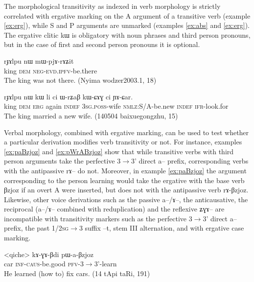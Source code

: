 \documentclass[oldfontcommands,oneside,a4paper,11pt]{article}
\newcommand{\ipa}[1]{{\phon \mbox{#1}}} %
\begin{document}
The morphological transitivity as indexed in verb morphology is strictly correlated with ergative marking on the A argument of a transitive verb (example \ref{ex:erg}), while S and P arguments are unmarked (examples \ref{ex:abs} and \ref{ex:erg}). The ergative clitic \ipa{kɯ} is obligatory with noun phrases and third person pronouns, but in the case of first and second person pronouns it is optional.  

 \begin{exe}
\ex \label{ex:abs}
\gll
\ipa{rɟɤlpu}  	\ipa{nɯ}  	\ipa{mɯ-pjɤ-rɤʑit}  \\
king \textsc{dem} \textsc{neg-evd.ipfv}-be.there \\
 \glt The king was not there. (Nyima wodzer2003.1, 18)
\end{exe}

 \begin{exe}
\ex \label{ex:erg}
\gll 
\ipa{rɟɤlpu}  	\ipa{nɯ}  	\ipa{kɯ}  	\ipa{li}  	\ipa{ci}  	\ipa{ɯ-rʑaβ}  	\ipa{kɯ-ɕɤɣ}  	\ipa{ci}  	\ipa{ɲɤ-ɕar.}  	 \\
king \textsc{dem} \textsc{erg} again \textsc{indef} \textsc{3sg.poss}-wife \textsc{nmlz}:S/A-be.new \textsc{indef}  \textsc{ifr}-look.for \\
\glt The king married a new wife. (140504 baixuegongzhu, 15)
\end{exe}

Verbal morphology, combined with ergative marking, can be used to test whether a particular derivation modifies verb transitivity or not. For instance, examples \ref{ex:paBzjoz} and \ref{ex:pWrABzjoz} show that while transitive verbs with third person arguments take the perfective $3\rightarrow$3' direct \ipa{a--} prefix,  corresponding verbs with the antipassive \ipa{rɤ--} do not. Moreover, in example \ref{ex:paBzjoz} the argument corresponding to the person learning would take the ergative with the base verb \ipa{βzjoz} if an overt A were inserted, but does not with the antipassive verb \ipa{rɤ-βzjoz}. Likewise, other voice derivations such as the passive \ipa{a--/ɤ--}, the anticausative, the reciprocal (\ipa{a--/ɤ--} combined with reduplication) and the reflexive \ipa{ʑɣɤ--}  are incompatible with transitivity markers such as the perfective $3\rightarrow$3' direct \ipa{a--} prefix, the past \textsc{1/2sg}$\rightarrow$3 suffix \ipa{--t}, stem III alternation, and with ergative case marking.

 \begin{exe}
\ex \label{ex:paBzjoz}
\gll 
<qiche> 	\ipa{kɤ-ɣɤ-βdi} 	\ipa{pɯ-a-βzjoz} \\
car \textsc{inf-caus}-be.good \textsc{pfv}-3$\rightarrow$3'-learn \\
\glt He learned (how to) fix cars. (14 tApi taRi, 191)
\end{exe}
\end{document}
